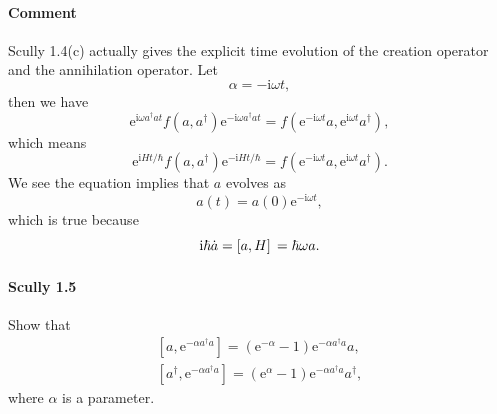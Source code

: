 \documentclass[hyperref, a4paper]{article}
\newcommand*{\ii}{\mathrm{i}}
\newcommand*{\ee}{\mathrm{e}}
\begin{document}
\paragraph{Comment} Scully 1.4(c) actually gives the explicit time evolution of the creation operator and the annihilation operator.
Let 
\[
    \alpha = - \ii \omega t,
\]
then we have 
\[
    \ee^{\ii \omega a^\dagger a t} f(a, a^\dagger) \ee^{- \ii \omega a^\dagger a t} = f(\ee^{- \ii \omega t} a, \ee^{\ii \omega t} a^\dagger),
\]
which means
\begin{equation}
    \ee^{\ii H t / \hbar} f(a, a^\dagger) \ee^{- \ii H t / \hbar} = f(\ee^{- \ii \omega t} a, \ee^{\ii \omega t} a^\dagger).
\end{equation}
We see the equation implies that $a$ evolves as 
\[
    a(t) = a(0) \ee^{- \ii \omega t},
\]
which is true because 
\[
    \ii \hbar \dot{a} = \comm*{a}{H} = \hbar \omega a.
\]

\paragraph{}

\paragraph{Scully 1.5} Show that
\begin{equation}
    \begin{gathered}
        {\left[a, \ee^{-\alpha a^{\dagger} a}\right]=\left(\ee^{-\alpha}-1\right) \ee^{-\alpha a^{\dagger} a} a}, \\
        {\left[a^{\dagger}, \ee^{-\alpha a^{\dagger} a}\right]=\left(\ee^{\alpha}-1\right) \ee^{-\alpha a^{\dagger} a} a^{\dagger}},
        \end{gathered}
    \label{eq:scully-1-5-1}
\end{equation}
where $\alpha$ is a parameter.
\end{document}
